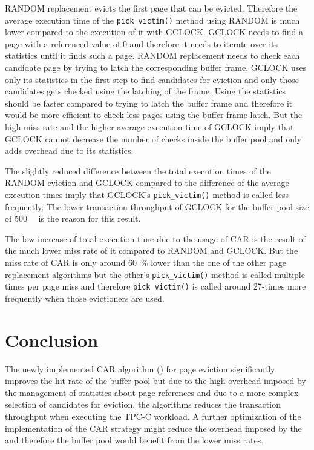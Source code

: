     RANDOM replacement evicts the first page that can be evicted. Therefore the average execution time of the \lstinline{pick_victim()} method using RANDOM is much lower compared to the execution of it with GCLOCK. GCLOCK needs to find a page with a referenced value of \num{0} and therefore it needs to iterate over its statistics until it finds such a page. RANDOM replacement needs to check each candidate page by trying to latch the corresponding buffer frame. GCLOCK uses only its statistics in the first step to find candidates for eviction and only those candidates gets checked using the latching of the frame. Using the statistics should be faster compared to trying to latch the buffer frame and therefore it would be more efficient to check less pages using the buffer frame latch. But the high miss rate and the higher average execution time of GCLOCK imply that GCLOCK cannot decrease the number of checks inside the buffer pool and only adds overhead due to its statistics.

    The slightly reduced difference between the total execution times of the RANDOM eviction and GCLOCK compared to the difference of the average execution times imply that GCLOCK's \lstinline{pick_victim()} method is called less frequently. The lower transaction throughput of GCLOCK for the buffer pool size of \SI{500}{\mebi\byte} is the reason for this result.

    The low increase of total execution time due to the usage of CAR is the result of the much lower miss rate of it compared to RANDOM and GCLOCK. But the miss rate of CAR is only around \SI{60}{\percent} lower than the one of the other page replacement algorithms but the other's \lstinline{pick_victim()} method is called multiple times per page miss and therefore \lstinline{pick_victim()} is called around 27-times more frequently when those evictioners are used.

\section{Conclusion}

    The newly implemented CAR algorithm (\cite{Bansal:2004}) for page eviction significantly improves the hit rate of the buffer pool but due to the high overhead imposed by the management of statistics about page references and due to a more complex selection of candidates for eviction, the algorithms reduces the transaction throughput when executing the TPC-C workload. A further optimization of the implementation of the CAR strategy might reduce the overhead imposed by the and therefore the buffer pool would benefit from the lower miss rates.

